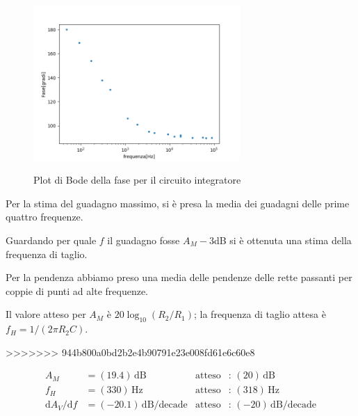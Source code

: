 \documentclass[10pt,a4paper]{article}
\begin{document}
         \begin{figure}[h]
                                       
		\begin{center}
			\includegraphics[width=0.7\textwidth]{fase}
			 \label{fig:fase}
		\end{center}
		\caption{\small Plot di Bode della fase per il circuito integratore}
		
	\end{figure}
	 
	Per la stima del guadagno massimo, si è presa la media dei guadagni delle prime quattro frequenze.


	Guardando per quale $f$ il guadagno fosse  $A_M - 3 $dB si è ottenuta una stima della frequenza di taglio.

	Per la pendenza abbiamo preso una media delle pendenze delle rette passanti per coppie di punti ad alte frequenze.

	Il valore atteso per $A_M $ è $ 20 \log_{10}(R_2/R_1)$; la frequenza di taglio attesa è $f_H = 1/(2\pi R_2 C)$.

>>>>>>> 944b800a0bd2b2e4b90791e23e008fd61e6c60e8
	
	\begin{align*}
	A_M &= (19.4 )\,\mathrm{dB} & \mathrm{atteso} &:\,(20  )\, \mathrm{dB}  \\
	f_H &= (330 )\,\mathrm{Hz} & \mathrm{atteso} &:\,(318  )\, \mathrm{Hz} \\
	{\mathrm{d}A_V}/{\mathrm{d}f} &= (-20.1 )\,\mathrm{dB/decade} & \mathrm{atteso} &:\,(-20  )\, \mathrm{dB/decade}  \\
	\end{align*}
	
	\clearpage
\end{document}
